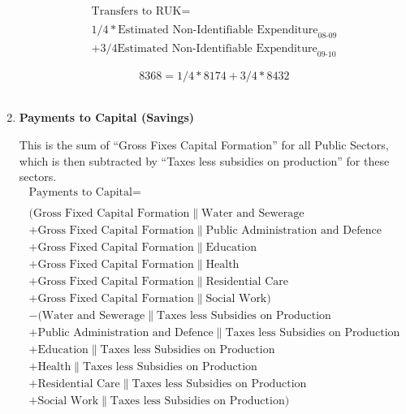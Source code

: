 \begin{enumerate}
\begin{equation}
\begin{split}
\text{Transfers to RUK} =  \\ \\
1/4*\text{Estimated Non-Identifiable Expenditure}_\text{08-09}\\
+3/4\text{Estimated Non-Identifiable Expenditure}_\text{09-10}
\end{split} \label{eq:2.5.45}
\end{equation}

\begin{equation} \nonumber
8368 = 1/4*8174+3/4*8432
\end{equation}\\


\item \textbf {Payments to Capital (Savings)}

This is the sum of ``Gross Fixes Capital Formation'' for all Public Sectors, which is then subtracted by ``Taxes less subsidies on production'' for these sectors. \cite{ScotGov2013a}\\

\begin{equation}
\begin{split}
\text{Payments to Capital} =  \\ \\
(\text{Gross Fixed Capital Formation}\|\text{Water and Sewerage}\\
+\text{Gross Fixed Capital Formation}\|\text{Public Administration and Defence}\\
+\text{Gross Fixed Capital Formation}\|\text{Education}\\
+\text{Gross Fixed Capital Formation}\|\text{Health}\\
+\text{Gross Fixed Capital Formation}\|\text{Residential Care}\\
+\text{Gross Fixed Capital Formation}\|\text{Social Work})\\
-(\text{Water and Sewerage}\|\text{Taxes less Subsidies on Production}\\
+\text{Public Administration and Defence}\|\text{Taxes less Subsidies on Production}\\
+\text{Education}\|\text{Taxes less Subsidies on Production}\\
+\text{Health}\|\text{Taxes less Subsidies on Production}\\
+\text{Residential Care}\|\text{Taxes less Subsidies on Production}\\
+\text{Social Work}\|\text{Taxes less Subsidies on Production})
\end{split} \label{eq:2.5.46}
\end{equation}


\end{enumerate}
